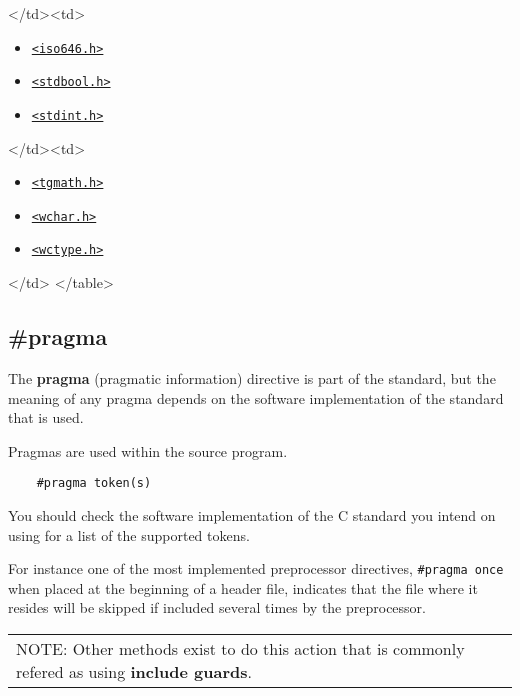 \textless{}/td\textgreater{}\textless{}td\textgreater{}
\begin{itemize}
	\item \texttt{\href{http://en.wikipedia.org/wiki/Iso646.h}{\textless{}iso646.h\textgreater{}}}
	\item \texttt{\href{http://en.wikipedia.org/wiki/Stdbool.h}{\textless{}stdbool.h\textgreater{}}}
	\item \texttt{\href{http://en.wikipedia.org/wiki/Stdint.h}{\textless{}stdint.h\textgreater{}}}
\end{itemize}

\textless{}/td\textgreater{}\textless{}td\textgreater{}
\begin{itemize}
	\item \texttt{\href{http://en.wikipedia.org/wiki/Tgmath.h}{\textless{}tgmath.h\textgreater{}}}
	\item \texttt{\href{http://en.wikipedia.org/wiki/Wchar.h}{\textless{}wchar.h\textgreater{}}}
	\item \texttt{\href{http://en.wikipedia.org/wiki/Wctype.h}{\textless{}wctype.h\textgreater{}}}
\end{itemize}

\textless{}/td\textgreater{}
\textless{}/table\textgreater{}

\subsection{\#pragma}
The \textbf{pragma} (pragmatic information) directive is part of the standard, but the meaning of any pragma depends on the software implementation of the standard that is used.

Pragmas are used within the source program.

\begin{verbatim}
	#pragma token(s)
\end{verbatim}

You should check the software implementation of the C standard you intend on using for a list of the supported tokens. 

For instance one of the most implemented preprocessor directives, \texttt{\#pragma once} when placed at the beginning of a header file, indicates that the file where it resides will be skipped if included several times by the preprocessor.

\begin{table}[H]
	\begin{tabular}{ p{} }
		 NOTE: Other methods exist to do this action that is commonly refered as using \textbf{include guards}. \\
	\end{tabular}
\end{table}

